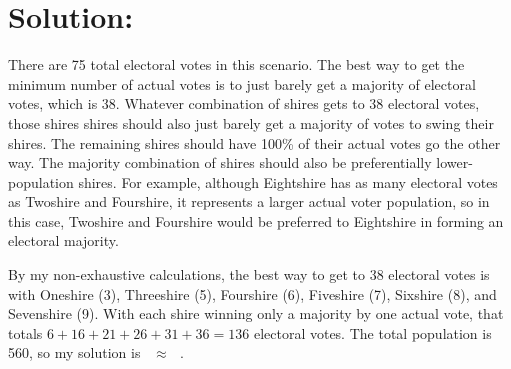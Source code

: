 \documentclass{article}
\begin{document}
\section*{Solution:}

There are 75 total electoral votes in this scenario.
The best way to get the minimum number of actual votes is to just barely get a majority of electoral votes, which is 38.
Whatever combination of shires gets to 38 electoral votes, those shires shires should also just barely get a majority of votes to swing their shires.
The remaining shires should have 100\% of their actual votes go the other way.
The majority combination of shires should also be preferentially lower-population shires.
For example, although Eightshire has as many electoral votes as Twoshire and Fourshire, it represents a larger actual voter population, so in this case, Twoshire and Fourshire would be preferred to Eightshire in forming an electoral majority.

By my non-exhaustive calculations, the best way to get to 38 electoral votes is with Oneshire (3), Threeshire (5), Fourshire (6), Fiveshire (7), Sixshire (8), and Sevenshire (9).
With each shire winning only a majority by one actual vote, that totals $6+16+21+26+31+36=136$ electoral votes.
The total population is 560, so my solution is ~$\approx$~\,.
\end{document}
